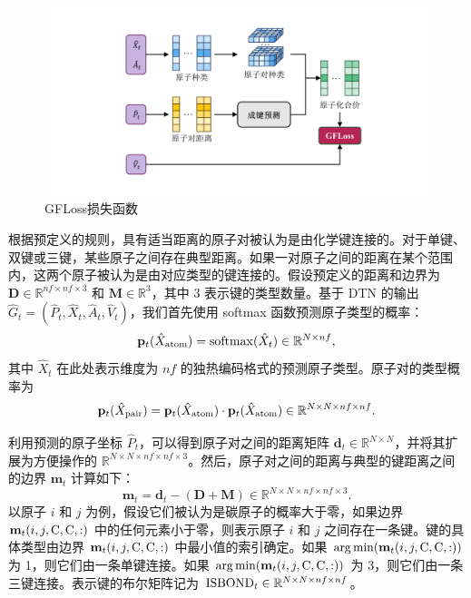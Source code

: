 \begin{figure}[h]
    \centering
    \includegraphics[width=\linewidth]{figures/gfloss.png}
    \caption{GFLoss损失函数}
    \label{fig:gfloss}
\end{figure} 

根据预定义的规则，具有适当距离的原子对被认为是由化学键连接的。对于单键、双键或三键，某些原子之间存在典型距离。如果一对原子之间的距离在某个范围内，这两个原子被认为是由对应类型的键连接的。假设预定义的距离和边界为 $\mathbf{D} \in \mathbb{R}^{nf \times nf \times 3}$ 和 $\mathbf{M} \in \mathbb{R}^{3}$，其中 3 表示键的类型数量。基于 DTN 的输出 $\hat{G}_t = (\hat{P}_t, \hat{X}_t, \hat{A}_t, \hat{V}_t)$，我们首先使用 softmax 函数预测原子类型的概率：
\begin{equation}
    {\mathbf{p}}_t(\hat{X}_{{\rm atom}}) = {\rm softmax}(\hat{X}_t) \in \mathbb{R}^{N \times nf},
\end{equation}
其中 $\hat{X}_t$ 在此处表示维度为 $nf$ 的独热编码格式的预测原子类型。原子对的类型概率为
\begin{equation}
    {\mathbf{p}}_t(\hat{X}_{{\rm pair}}) = {\mathbf{p}}_t(\hat{X}_{{\rm atom}}) \cdot {\mathbf{p}}_t(\hat{X}_{{\rm atom}}) \in \mathbb{R}^{N \times N \times nf \times nf}.
\end{equation}

利用预测的原子坐标 $\hat{P}_t$，可以得到原子对之间的距离矩阵 $\mathbf{d}_t \in \mathbb{R}^{N \times N}$，并将其扩展为方便操作的 $\mathbb{R}^{N \times N \times nf \times nf \times 3}$。然后，原子对之间的距离与典型的键距离之间的边界 $\mathbf{m}_t$ 计算如下：
\begin{equation}
    \mathbf{m}_t = \mathbf{d}_t - (\mathbf{D} + \mathbf{M}) \in \mathbb{R}^{N \times N \times nf \times nf \times 3}.
\end{equation}
以原子 $i$ 和 $j$ 为例，假设它们被认为是碳原子的概率大于零，如果边界 $\mathbf{m}_t(i,j,{\rm C},{\rm C},:)$ 中的任何元素小于零，则表示原子 $i$ 和 $j$ 之间存在一条键。键的具体类型由边界 $\mathbf{m}_t(i,j,{\rm C},{\rm C},:)$ 中最小值的索引确定。如果 $\arg\min (\mathbf{m}_t(i,j,{\rm C},{\rm C},:))$ 为 1，则它们由一条单键连接。如果 $\arg\min (\mathbf{m}_t(i,j,{\rm C},{\rm C},:))$ 为 3，则它们由一条三键连接。表示键的布尔矩阵记为 ${\rm ISBOND}_t \in \mathbb{R}^{N \times N \times nf \times nf}$。

